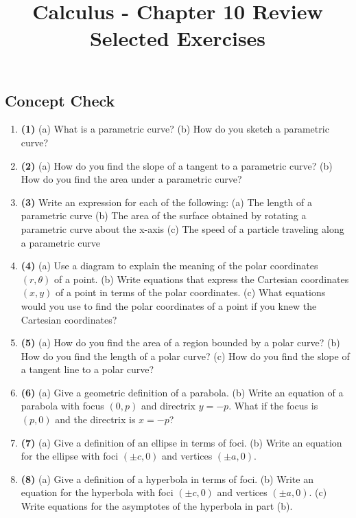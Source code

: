\documentclass[12pt, a4paper]{article}
\title{Calculus - Chapter 10 Review Selected Exercises}
\author{}
\date{}
\begin{document}
\maketitle
\hrulefill
\vspace{1em}

\subsection*{Concept Check}
\begin{enumerate}
    \item \textbf{(1)} (a) What is a parametric curve? 
    (b) How do you sketch a parametric curve?

    \item \textbf{(2)} (a) How do you find the slope of a tangent to a parametric curve? 
    (b) How do you find the area under a parametric curve?

    \item \textbf{(3)} Write an expression for each of the following:
    (a) The length of a parametric curve
    (b) The area of the surface obtained by rotating a parametric curve about the x-axis
    (c) The speed of a particle traveling along a parametric curve

    \item \textbf{(4)} (a) Use a diagram to explain the meaning of the polar coordinates $(r, \theta)$ of a point.
    (b) Write equations that express the Cartesian coordinates $(x, y)$ of a point in terms of the polar coordinates.
    (c) What equations would you use to find the polar coordinates of a point if you knew the Cartesian coordinates?

    \item \textbf{(5)} (a) How do you find the area of a region bounded by a polar curve?
    (b) How do you find the length of a polar curve?
    (c) How do you find the slope of a tangent line to a polar curve?

    \item \textbf{(6)} (a) Give a geometric definition of a parabola.
    (b) Write an equation of a parabola with focus $(0, p)$ and directrix $y = -p$. What if the focus is $(p, 0)$ and the directrix is $x = -p$?

    \item \textbf{(7)} (a) Give a definition of an ellipse in terms of foci.
    (b) Write an equation for the ellipse with foci $(\pm c, 0)$ and vertices $(\pm a, 0)$.

    \item \textbf{(8)} (a) Give a definition of a hyperbola in terms of foci.
    (b) Write an equation for the hyperbola with foci $(\pm c, 0)$ and vertices $(\pm a, 0)$.
    (c) Write equations for the asymptotes of the hyperbola in part (b).
\end{enumerate}
\end{document}
